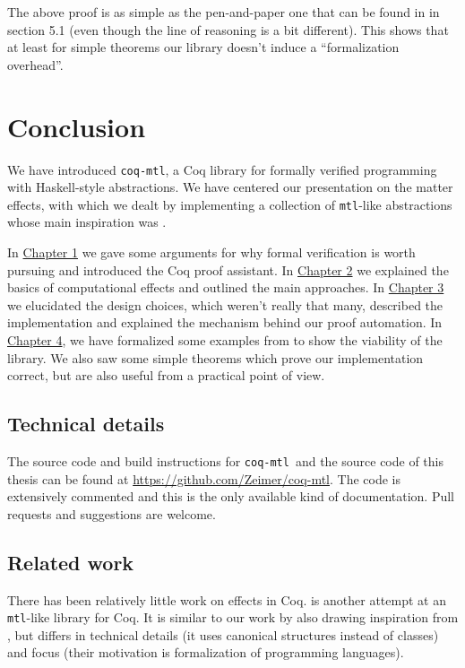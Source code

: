\documentclass[declaration,inz,english,shortabstract]{iithesis}
\newcommand{\libname}{\m{coq-mtl}}
\newcommand{\homepage}{\url{https://github.com/Zeimer/coq-mtl}}
\newcommand{\m}[1]{\texttt{#1}}
\begin{document}
The above proof is as simple as the pen-and-paper one that can be found in \cite{JustDoIt} in section 5.1 (even though the line of reasoning is a bit different). This shows that at least for simple theorems our library doesn't induce a ``formalization overhead''.

\chapter{Conclusion} \label{ch5}

We have introduced \libname, a Coq library for formally verified programming with Haskell-style abstractions. We have centered our presentation on the matter effects, with which we dealt by implementing a collection of \m{mtl}-like abstractions whose main inspiration was \cite{JustDoIt}.

In \hyperref[ch1]{Chapter 1} we gave some arguments for why formal verification is worth pursuing and introduced the Coq proof assistant. In \hyperref[ch2]{Chapter 2} we explained the basics of computational effects and outlined the main approaches. In \hyperref[ch3]{Chapter 3} we elucidated the design choices, which weren't really that many, described the implementation and explained the mechanism behind our proof automation. In \hyperref[ch4]{Chapter 4}, we have formalized some examples from \cite{JustDoIt} to show the viability of the library. We also saw some simple theorems which prove our implementation correct, but are also useful from a practical point of view.

\section{Technical details}

The source code and build instructions for \libname\ and the source code of this thesis can be found at \homepage. The code is extensively commented and this is the only available kind of documentation. Pull requests and suggestions are welcome.

\section{Related work}

There has been relatively little work on effects in Coq. \cite{MERC} is another attempt at an \m{mtl}-like library for Coq. It is similar to our work by also drawing inspiration from \cite{JustDoIt}, but differs in technical details (it uses canonical structures instead of classes) and focus (their motivation is formalization of programming languages).
\end{document}
